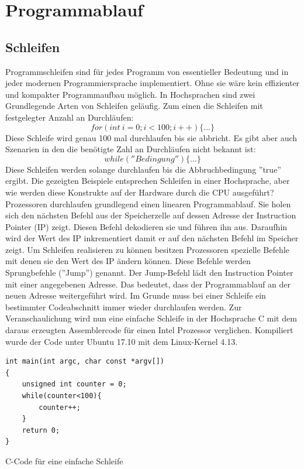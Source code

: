 \documentclass[12pt]{article}
\begin{document}
\newpage
\section{Programmablauf}	\label{sec:programmablauf}
\subsection{Schleifen}
Programmschleifen sind für jedes Programm von essentieller Bedeutung und in jeder modernen Programmiersprache implementiert. Ohne sie wäre kein effizienter und kompakter Programmaufbau möglich. In Hochsprachen sind zwei Grundlegende Arten von Schleifen geläufig. Zum einen die Schleifen mit festgelegter Anzahl an Durchläufen: 
$$for(int \ i=0; i<100; i++)\{...\}$$
Diese Schleife wird genau 100 mal durchlaufen bis sie abbricht. Es gibt aber auch Szenarien in den die benötigte Zahl an Durchläufen nicht bekannt ist:
$$while(''Bedingung'')\{...\}$$
Diese Schleifen werden solange durchlaufen bis die Abbruchbedingung ''true'' ergibt. Die gezeigten Beispiele entsprechen Schleifen in einer Hochsprache, aber wie werden diese Konstrukte auf der Hardware durch die CPU ausgeführt?
Prozessoren durchlaufen grundlegend einen linearen Programmablauf. Sie holen sich den nächsten Befehl aus der Speicherzelle auf dessen Adresse der Instruction Pointer (IP) zeigt. Diesen Befehl dekodieren sie und führen ihn aus. Daraufhin wird der Wert des IP inkrementiert damit er auf den nächsten Befehl im Speicher zeigt. Um Schleifen realisieren zu können besitzen Prozessoren spezielle Befehle mit denen sie den Wert des IP ändern können. Diese Befehle werden Sprungbefehle (''Jump'') genannt. Der Jump-Befehl lädt den Instruction Pointer mit einer angegebenen Adresse. Das bedeutet, dass der Programmablauf an der neuen Adresse weitergeführt wird. Im Grunde muss bei einer Schleife ein bestimmter Codeabschnitt immer wieder durchlaufen werden. Zur Veranschaulichung wird nun eine einfache Schleife in der Hochsprache C mit dem daraus erzeugten Assemblercode für einen Intel Prozessor verglichen. Kompiliert wurde der Code unter Ubuntu 17.10 mit dem Linux-Kernel 4.13.

\begin{code}[!htb]
\begin{lstlisting}
int main(int argc, char const *argv[])
{
	unsigned int counter = 0;
	while(counter<100){
		counter++;
	}
	return 0;
}
\end{lstlisting}
\caption[C Code einfache Schleife]{C-Code für eine einfache Schleife}
\label{code:scheife}
\end{code}
\end{document}
